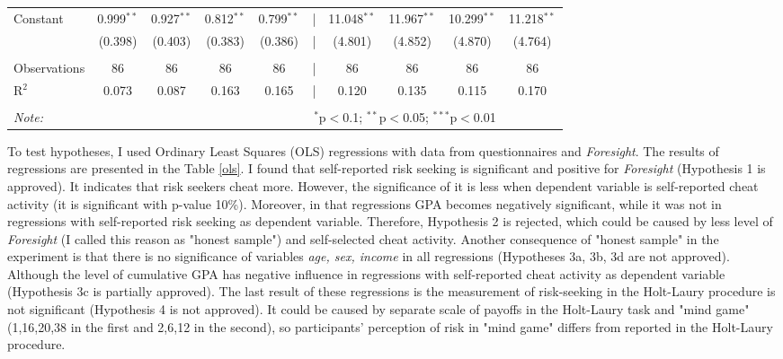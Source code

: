\documentclass[12pt]{article}
\begin{document}
\begin{table}[!htbp]
\begin{tabular}{@{\extracolsep{5pt}}lccccccccc}
		 Constant & 0.999$^{**}$ & 0.927$^{**}$ & 0.812$^{**}$ & 0.799$^{**}$ & |& 11.048$^{**}$ & 11.967$^{**}$ & 10.299$^{**}$ & 11.218$^{**}$ \\ 
		  & (0.398) & (0.403) & (0.383) & (0.386) & |& (4.801) & (4.852) & (4.870) & (4.764) \\ 
		\hline \\[-1.8ex] 
		Observations & 86 & 86 & 86 & 86 & |& 86 & 86 & 86 & 86 \\ 
		R$^{2}$ & 0.073 & 0.087 & 0.163 & 0.165 & |& 0.120 & 0.135 & 0.115 & 0.170 \\ 
		\hline 
		\hline \\[-1.8ex] 
		\textit{Note:}  & \multicolumn{8}{r}{$^{*}$p$<$0.1; $^{**}$p$<$0.05; $^{***}$p$<$0.01} \\ 
		\end{tabular} 
	\end{table}

	To test hypotheses, I used Ordinary Least Squares (OLS) regressions with data from questionnaires and \textit{Foresight}. The results of regressions are presented in the Table \ref{ols}. I found that self-reported risk seeking is significant and positive for \textit{Foresight} (Hypothesis 1 is approved). It indicates that risk seekers cheat more. However, the significance of it is less when dependent variable is self-reported cheat activity (it is significant with  p-value 10\%). Moreover, in that regressions GPA becomes negatively significant, while it was not in regressions with self-reported risk seeking as dependent variable. Therefore, Hypothesis 2 is rejected, which could be caused by less level of \textit{Foresight} (I called this reason as "honest sample") and self-selected cheat activity. Another consequence of "honest sample" in the experiment is that there is no significance of variables  \textit{age, sex, income} in all regressions (Hypotheses 3a, 3b, 3d are not approved). Although the level of cumulative GPA has negative influence in regressions with self-reported cheat activity as dependent variable (Hypothesis 3c is partially approved). The last result of these regressions is the measurement of risk-seeking in the Holt-Laury procedure is not significant (Hypothesis 4 is not approved). It could be caused by separate scale of payoffs in the Holt-Laury task and "mind game" (1,16,20,38 in the first and 2,6,12 in the second), so participants' perception of risk in "mind game" differs from reported in the Holt-Laury procedure. 
	
\end{document}
